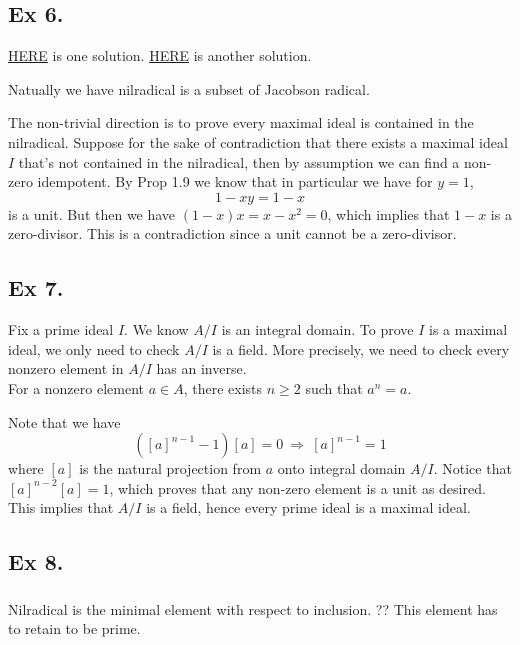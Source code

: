 \subsection{Ex 6.}

\href{https://math.stackexchange.com/questions/2816529/check-my-proof-that-the-nilradical-and-the-jacobson-radical-are-equal-am-1-6}{HERE} is one solution. \href{https://math.stackexchange.com/questions/925332/atiyah-macdonald-problem-6-of-chapter-1  }{HERE} is another solution.

Natually we have nilradical is a subset of Jacobson radical.

The non-trivial direction is to prove every maximal ideal is contained in the nilradical. Suppose for the sake of contradiction that there exists a maximal ideal $I$ that's not contained in the nilradical, then by assumption we can find a non-zero idempotent.
By Prop 1.9 we know that in particular we 
have for $y=1$,
$$1-xy=1-x$$ is a unit. But then we have $(1-x)x=x-x^2=0$, which implies that $1-x$ is a zero-divisor. This is a contradiction since a unit cannot be a zero-divisor. \



\subsection{Ex 7.}\label{Chap 1 Ex 7.}

Fix a prime ideal $I$.
We know $A/I$ is an integral domain. To prove $I$ is a maximal ideal, we only need to check $A/I$ is a field. More precisely, we need to check every nonzero element in $A/I$ has an inverse.\\

For a nonzero element $a\in A$, there exists $n\geq 2$ such that $a^n=a$.

Note that we have 
$$([a]^{n-1}-1)[a]=0 ~\Rightarrow~ [a]^{n-1}=1$$ where $[a]$ is the natural projection from $a$ onto integral domain $A/I$. Notice that $[a]^{n-2}[a]=1$, which proves that any non-zero element is a unit as desired. This implies that $A/I$ is a field, hence every prime ideal is a maximal ideal.



\subsection{Ex 8.}\label{Atiyah Chapter 1 Ex 8.}

\subsubsection{}
Nilradical is the minimal element with respect to inclusion. ?? This element has to retain to be prime.

